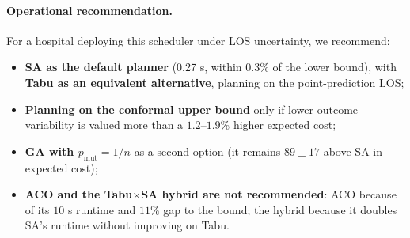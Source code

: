 \documentclass[11pt,a4paper]{article}
\begin{document}
\paragraph{Operational recommendation.}
For a hospital deploying this scheduler under LOS uncertainty, we recommend:
\begin{itemize}[nosep]
\item \textbf{SA as the default planner} (0.27 s, within \(0.3\%\) of the lower bound), with \textbf{Tabu as an equivalent alternative}, planning on the point-prediction LOS;
\item \textbf{Planning on the conformal upper bound} only if lower outcome variability is valued more than a \(1.2\)--\(1.9\%\) higher expected cost;
\item \textbf{GA with \(p_{\mathrm{mut}}=1/n\)} as a second option (it remains \(89 \pm 17\) above SA in expected cost);
\item \textbf{ACO and the Tabu\(\times\)SA hybrid are not recommended}: ACO because of its \(10\) s runtime and \(11\%\) gap to the bound; the hybrid because it doubles SA's runtime without improving on Tabu.
\end{itemize}
\end{document}
